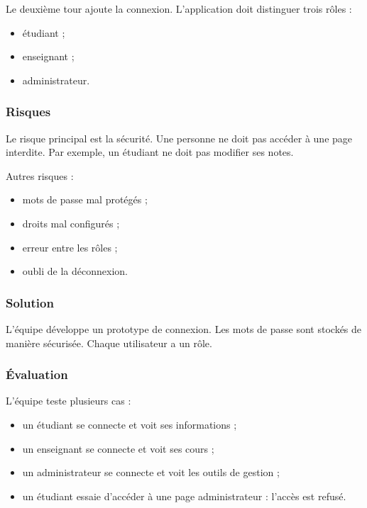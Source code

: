 \documentclass[12pt,a4paper]{article}
\begin{document}
Le deuxième tour ajoute la connexion. L'application doit distinguer trois rôles :

\begin{itemize}
    \item étudiant ;
    \item enseignant ;
    \item administrateur.
\end{itemize}

\subsubsection{Risques}

Le risque principal est la sécurité. Une personne ne doit pas accéder à une page interdite. Par exemple, un étudiant ne doit pas modifier ses notes.

Autres risques :

\begin{itemize}
    \item mots de passe mal protégés ;
    \item droits mal configurés ;
    \item erreur entre les rôles ;
    \item oubli de la déconnexion.
\end{itemize}

\subsubsection{Solution}

L'équipe développe un prototype de connexion. Les mots de passe sont stockés de manière sécurisée. Chaque utilisateur a un rôle.

\subsubsection{Évaluation}

L'équipe teste plusieurs cas :

\begin{itemize}
    \item un étudiant se connecte et voit ses informations ;
    \item un enseignant se connecte et voit ses cours ;
    \item un administrateur se connecte et voit les outils de gestion ;
    \item un étudiant essaie d'accéder à une page administrateur : l'accès est refusé.
\end{itemize}
\end{document}
